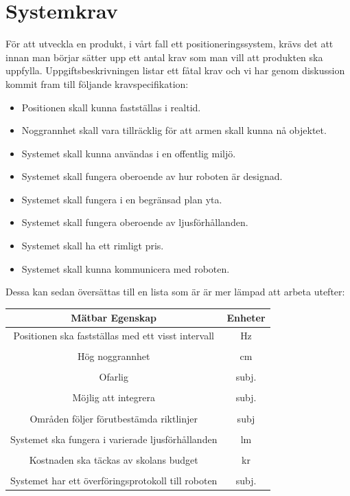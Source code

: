 \documentclass[11pt, a4paper]{report}
\begin{document}
\section{Systemkrav}\label{sec:syskrav}
För att utveckla en produkt, i vårt fall ett positioneringssystem, krävs det att innan man börjar sätter upp ett antal krav som man vill att produkten ska uppfylla. Uppgiftsbeskrivningen listar ett fåtal krav och vi har genom diskussion kommit fram till följande kravspecifikation:
\begin{itemize}
\item Positionen skall kunna fastställas i realtid.
\item Noggrannhet skall vara tillräcklig för att armen skall kunna nå objektet.
\item Systemet skall kunna användas i en offentlig miljö.
\item Systemet skall fungera oberoende av hur roboten är designad.
\item Systemet skall fungera i en begränsad plan yta.
\item Systemet skall fungera oberoende av ljusförhållanden.
\item Systemet skall ha ett rimligt pris.
\item Systemet skall kunna kommunicera med roboten.

\end{itemize}
 Dessa kan sedan översättas till en lista som är är mer lämpad att arbeta utefter:
 \begin{center}
     \begin{tabular}{ c | c}
     	Mätbar Egenskap & Enheter  \\ \hline
  		Positionen ska fastställas med ett visst intervall & Hz  \\ \\
        Hög noggrannhet & cm\\ \\ 
        Ofarlig & subj. \\ \\
        Möjlig att integrera & subj.\\ \\
        Områden följer förutbestämda riktlinjer & subj\\ \\
        Systemet ska fungera i varierade ljusförhållanden & lm\\ \\
        Kostnaden ska täckas av skolans budget & kr  \\ \\
        Systemet har ett överföringsprotokoll till roboten & subj.\\ 

  \end{tabular}
  \end{center}
\end{document}
